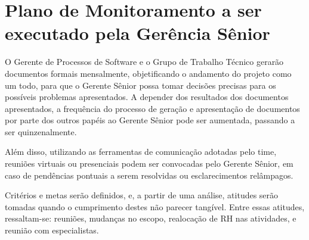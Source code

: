 \chapter[Plano de Monitoramento a ser executado pela Gerência Sênior]{Plano de Monitoramento a ser executado pela Gerência Sênior}

O Gerente de Processos de Software e o Grupo de Trabalho Técnico gerarão documentos formais mensalmente, objetificando o andamento do projeto como um todo, para que o Gerente Sênior possa tomar decisões precisas para os possíveis problemas apresentados. A depender dos resultados dos documentos apresentados, a frequência do processo de geração e apresentação de documentos por parte dos outros papéis ao Gerente Sênior pode ser aumentada, passando a ser quinzenalmente.

Além disso, utilizando as ferramentas de comunicação adotadas pelo time, reuniões virtuais ou presenciais podem ser convocadas pelo Gerente Sênior, em caso de pendências pontuais a serem resolvidas ou esclarecimentos relâmpagos.

Critérios e metas serão definidos, e, a partir de uma análise, atitudes serão tomadas quando o cumprimento destes não parecer tangível. Entre essas atitudes, ressaltam-se: reuniões, mudanças no escopo, realocação de RH nas atividades, e reunião com especialistas.